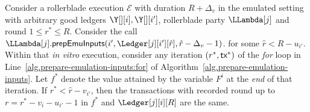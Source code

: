 \begin{lemma}\label{lem:transcription-past-perfect}
  Consider a rollerblade execution $\mathcal{E}$ with duration $R + \Delta_v$ in the emulated setting
  with arbitrary good ledgers $\Y[][i], \Y[][i']$, rollerblade party $\LLambda[j]$
  and round $1 \leq r^* \leq R$.
  Consider the call $\LLambda[j].\prepareEmulationInputs(i', \Ledger[j][i'][\hat{r}], \hat{r} - \Delta_v - 1)$.
  for some $\hat{r} < R - u_{i'}$.
  Within that \emph{in vitro} execution,
  consider any iteration $(r^*, \textsf{tx}^*)$ of the
  \emph{for} loop in Line~\ref{alg.prepare-emulation-inputs:for}
  of Algorithm~\ref{alg.prepare-emulation-inputs}.
  Let $f^*$ denote the value attained by the variable $F^i$
  at the \emph{end} of that iteration.
  If $r^* < \hat{r} - v_{i'}$, then
  the transactions with recorded round
  up to $r = r^* - v_i - u_{i'} - 1$ in $f^*$ and $\Ledger[j][i][R]$ are the same.
\end{lemma}
